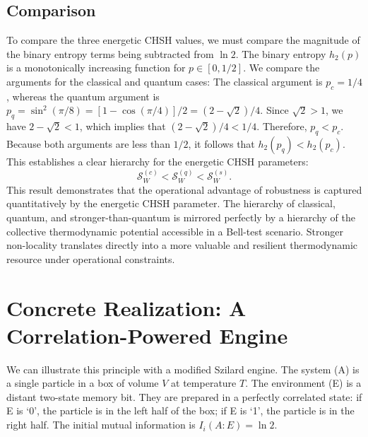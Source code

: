 \documentclass[%
  reprint,
  showpacs,
  showkeys,
  pra,
  longbibliography,
  floatfix,
  x11names
]{revtex4-2}
\begin{document}
\subsection{Comparison}
To compare the three energetic CHSH values, we must compare the magnitude of the binary entropy terms being subtracted from $\ln 2$. The binary entropy $h_2(p)$ is a monotonically increasing function for $p \in [0, 1/2]$. We compare the arguments for the classical and quantum cases:
The classical argument is $p_c = 1/4$, whereas the quantum argument is $p_q = \sin^2(\pi/8) = \left[1 - \cos(\pi/4)\right]/2 = \left(2-\sqrt{2}\right)/4$.
Since $\sqrt{2} > 1$, we have $2-\sqrt{2} < 1$, which implies that $\left(2-\sqrt{2}\right)/4 <  {1}/{4}$.
Therefore, $p_q < p_c$. Because both arguments are less than $1/2$, it follows that $h_2(p_q) < h_2(p_c)$. This establishes a clear hierarchy for the energetic CHSH parameters:
\begin{equation}
\mathcal{S}_W^{(c)} < \mathcal{S}_W^{(q)} < \mathcal{S}_W^{(s)}.
\end{equation}
This result demonstrates that the operational advantage of robustness is captured quantitatively by the energetic CHSH parameter. The hierarchy of classical, quantum, and stronger-than-quantum is mirrored perfectly by a hierarchy of the collective thermodynamic potential accessible in a Bell-test scenario. Stronger non-locality translates directly into a more valuable and resilient thermodynamic resource under operational constraints.



\section{Concrete Realization: A Correlation-Powered Engine}
We can illustrate this principle with a modified Szilard engine. The system (A) is a single particle in a box of volume $V$ at temperature $T$. The environment (E) is a distant two-state memory bit. They are prepared in a perfectly correlated state: if E is `0', the particle is in the left half of the box; if E is `1', the particle is in the right half. The initial mutual information is $I_i(A:E) = \ln 2$.
\end{document}
